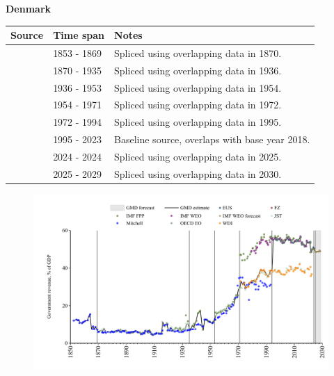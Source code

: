 \documentclass[12pt,a4paper,landscape]{article}
\begin{document}
\begin{adjustbox}{max totalsize={\paperwidth}{\paperheight},center}
\begin{minipage}[t][\textheight][t]{\textwidth}
\vspace*{0.5cm}
{}
\begin{center}
{\Large\bfseries Denmark}
\end{center}
\vspace{0.5cm}
\begin{table}[H]
\centering
\small
\begin{tabular}{|l|l|l|}
\hline
\textbf{Source} & \textbf{Time span} & \textbf{Notes} \\
\hline
\rowcolor{white}\cite{Mitchell}& 1853 - 1869 &Spliced using overlapping data in 1870.\\
\rowcolor{lightgray}\cite{JST}& 1870 - 1935 &Spliced using overlapping data in 1936.\\
\rowcolor{white}\cite{IMF_FPP}& 1936 - 1953 &Spliced using overlapping data in 1954.\\
\rowcolor{lightgray}\cite{JST}& 1954 - 1971 &Spliced using overlapping data in 1972.\\
\rowcolor{white}\cite{WDI}& 1972 - 1994 &Spliced using overlapping data in 1995.\\
\rowcolor{lightgray}\cite{OECD_EO}& 1995 - 2023 &Baseline source, overlaps with base year 2018.\\
\rowcolor{white}\cite{EUS}& 2024 - 2024 &Spliced using overlapping data in 2025.\\
\rowcolor{lightgray}\cite{IMF_WEO_forecast}& 2025 - 2029 &Spliced using overlapping data in 2030.\\
\hline
\end{tabular}
\end{table}
\begin{figure}[H]
\centering
\includegraphics[width=\textwidth,height=0.6\textheight,keepaspectratio]{graphs/DNK_govrev_GDP.pdf}
\end{figure}
\end{minipage}
\end{adjustbox}
\end{document}
